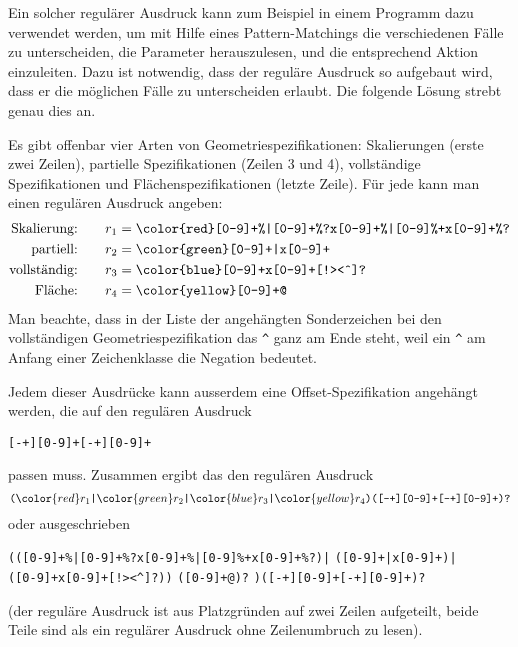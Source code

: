 \begin{loesung}
Ein solcher regulärer Ausdruck kann zum Beispiel in einem Programm dazu
verwendet werden, um mit Hilfe eines Pattern-Matchings die verschiedenen
Fälle zu unterscheiden, die Parameter herauszulesen, und die entsprechend
Aktion einzuleiten.
Dazu ist notwendig, dass der reguläre Ausdruck so aufgebaut wird, dass
er die möglichen Fälle zu unterscheiden erlaubt.
Die folgende Lösung strebt genau dies an.

Es gibt offenbar vier Arten von Geometriespezifikationen: Skalierungen 
(erste zwei Zeilen),
partielle Spezifikationen (Zeilen 3 und 4), vollständige Spezifikationen
und Flächenspezifikationen (letzte Zeile).
Für jede kann man einen regulären Ausdruck angeben:
\begin{align*}
\text{Skalierung:}\qquad&r_1 = \texttt{\color{red}[0-9]+\%|[0-9]+\%?x[0-9]+\%|[0-9]\%+x[0-9]+\%?}
\\
\text{partiell:}\qquad&r_2 = \texttt{\color{green}[0-9]+|x[0-9]+}
\\
\text{vollständig:}\qquad&r_3 = \texttt{\color{blue}[0-9]+x[0-9]+[!><\^{}]?}
\\
\text{Fläche:}\qquad&r_4 = \texttt{\color{yellow}[0-9]+@}
\end{align*}
Man beachte, dass in der Liste der angehängten Sonderzeichen bei den
vollständigen Geometriespezifikation das \texttt{\^{}} ganz am Ende
steht, weil ein \texttt{\^{}} am Anfang einer Zeichenklasse die
Negation bedeutet.


Jedem dieser Ausdrücke kann ausserdem eine Offset-Spezifikation angehängt
werden, die auf den regulären Ausdruck
\begin{center}
\texttt{[-+][0-9]+[-+][0-9]+}
\end{center}
passen muss. Zusammen ergibt das den regulären Ausdruck
\[
\texttt{(}
{\color{red} r_1}
\texttt{|}
{\color{green} r_2}
\texttt{|}
{\color{blue} r_3}
\texttt{|}
{\color{yellow} r_4}
\texttt{)([-+][0-9]+[-+][0-9]+)?}
\]
oder ausgeschrieben
\begin{center}
\texttt{(({\color{red}[0-9]+\%|[0-9]+\%?x[0-9]+\%|[0-9]\%+x[0-9]+\%?})|}%
\texttt{({\color{green}[0-9]+|x[0-9]+})|}\\
\texttt{({\color{blue}[0-9]+x[0-9]+[{}!><\^{}]?}))}%
\texttt{({\color{yellow}[0-9]+@})?}%
\texttt{)([-+][0-9]+[-+][0-9]+)?}
\end{center}
(der reguläre Ausdruck ist aus Platzgründen auf zwei Zeilen aufgeteilt,
beide Teile sind als ein regulärer Ausdruck ohne Zeilenumbruch zu lesen).


\end{loesung}
